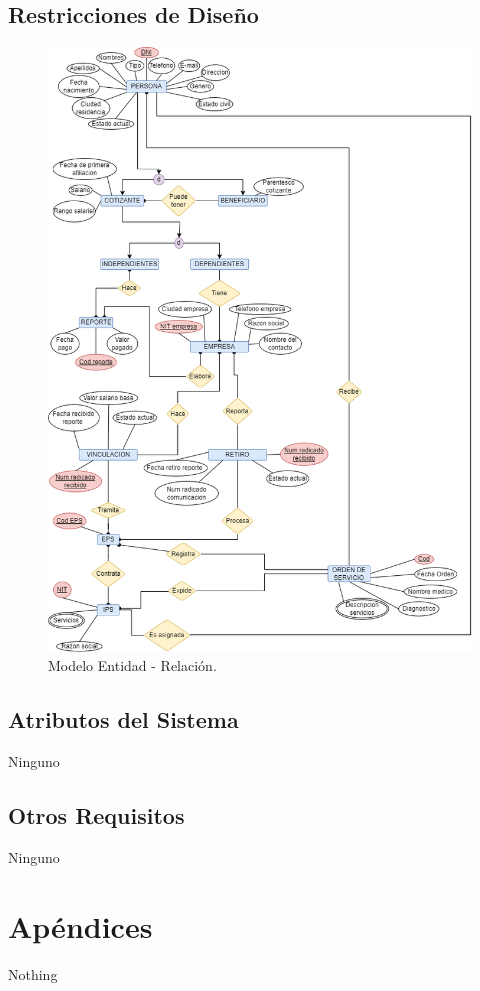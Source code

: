 \documentclass[12pt,a4paper]{article}
\begin{document}
\subsection{Restricciones de Diseño}
\begin{figure}[H]
\centering
{\includegraphics[width=1 \textwidth]{entity_relationship_model.png} \par}
\caption{Modelo Entidad - Relación.}
\end{figure}
\subsection{Atributos del Sistema}
Ninguno
\subsection{Otros Requisitos}
Ninguno
\section{Apéndices}
Nothing
\end{document}
